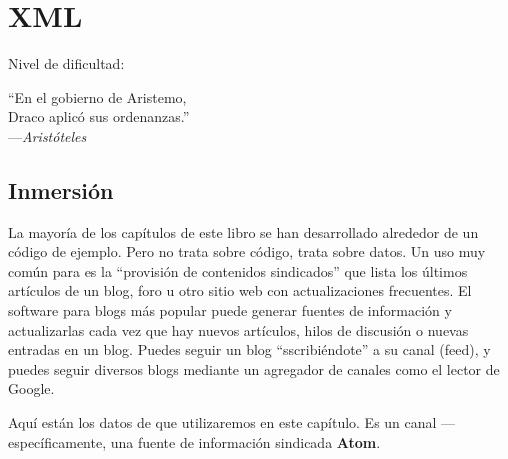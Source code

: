 
\chapter{XML}\label{ch:xml}

\noindent
Nivel de dificultad:\difllll

\begin{citaCap}
``En el gobierno de Aristemo, \\
Draco aplicó sus ordenanzas.'' \\
---\emph{Aristóteles}
\end{citaCap}

\section{Inmersión}

La mayoría de los capítulos de este libro se han desarrollado alrededor de un código de ejemplo. Pero  no trata sobre código, trata sobre datos. Un uso muy común para  es la ``provisión de contenidos sindicados'' que lista los últimos artículos de un blog, foro u otro sitio web con actualizaciones frecuentes. El software para blogs más popular puede generar fuentes de información y actualizarlas cada vez que hay nuevos artículos, hilos de discusión o nuevas entradas en un blog. Puedes seguir un blog ``sscribiéndote'' a su canal (feed), y puedes seguir diversos blogs mediante un agregador de canales como el lector de Google.

Aquí están los datos de  que utilizaremos en este capítulo. Es un canal ---específicamente, una fuente de información sindicada \textbf{Atom}.

